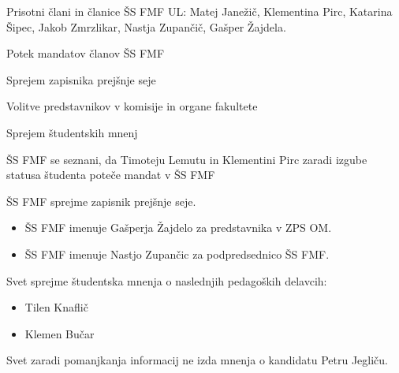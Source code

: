 \documentclass{seja}
\begin{document}
Prisotni člani in članice ŠS FMF UL:
Matej Janežič,
Klementina Pirc,
Katarina Šipec,
Jakob Zmrzlikar,
Nastja Zupančič,
Gašper Žajdela.


\begin{red*}
    \item
    Potek mandatov članov ŠS FMF
	\item
	Sprejem zapisnika prejšnje seje
	\item
	Volitve predstavnikov v komisije in organe fakultete
    \item
    Sprejem študentskih mnenj
\end{red*}



\begin{ad}
    \item 
    ŠS FMF se seznani, da Timoteju Lemutu in Klementini Pirc zaradi izgube statusa študenta poteče mandat v ŠS FMF
    \item
    \begin{sklep*}
        ŠS FMF sprejme zapisnik prejšnje seje.
    \end{sklep*}

    \item
    \begin{sklep*}
        \begin{itemize}
        \item ŠS FMF imenuje Gašperja Žajdelo za predstavnika v ZPS OM.
        \item ŠS FMF imenuje Nastjo Zupančic za podpredsednico ŠS FMF. 
        \end{itemize}
    \end{sklep*}
    
    \item 
    \begin{sklep*}
    Svet sprejme študentska mnenja o naslednjih pedagoških delavcih:
        \begin{itemize}
            \item Tilen Knaflič
            \item Klemen Bučar
        \end{itemize}
    Svet zaradi pomanjkanja informacij ne izda mnenja o kandidatu Petru Jegliču.
    \end{sklep*}
    
\end{ad}
\end{document}
